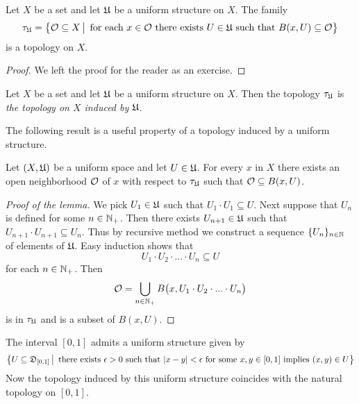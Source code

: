 \begin{fact}\label{fact:topology_induced_by_uniform_structure}
Let $X$ be a set and let ${\mathfrak U}$ be a uniform structure on $X$. The family
$$\tau_{{\mathfrak U}} = \big\{{\mathcal O}\subseteq X\,\big|\,\mbox{ for each }x\in {\mathcal O}\mbox{ there exists }U\in {\mathfrak U}\mbox{ such that }B(x,U)\subseteq {\mathcal O}\big\}$$
is a topology on $X$.
\end{fact}
\begin{proof}
We left the proof for the reader as an exercise.
\end{proof}

\begin{definition}
Let $X$ be a set and let ${\mathfrak U}$ be a uniform structure on $X$. Then the topology $\tau_{{\mathfrak U}}$ is \textit{the topology on $X$ induced by ${\mathfrak U}$}.
\end{definition}
\noindent
The following result is a useful property of a topology induced by a uniform structure. 

\begin{proposition}\label{proposition:each_ball_contains_an_open_subset_with_respect_to_topology_induced_by_uniform_structure}
Let $(X,{\mathfrak U})$ be a uniform space and let $U \in {\mathfrak U}$. For every $x$ in $X$ there exists an open neighborhood ${\mathcal O}$ of $x$ with respect to $\tau_{{\mathfrak U}}$ such that ${\mathcal O}\subseteq B(x,U)$.
\end{proposition}
\begin{proof}[Proof of the lemma]
We pick $U_1 \in {\mathfrak U}$ such that $U_1\cdot U_1 \subseteq U$. Next suppose that $U_n$ is defined for some $n\in {\mathbb N}_+$. Then there exists $U_{n+1}\in {\mathfrak U}$ such that $U_{n+1}\cdot U_{n+1} \subseteq U_n$. Thus by recursive method we construct a sequence $\{U_n\}_{n\in {\mathbb N}}$ of elements of ${\mathfrak U}$. Easy induction shows that
$$U_1\cdot U_2\cdot ...\cdot U_n \subseteq U$$
for each $n\in {\mathbb N}_+$. Then
$${\mathcal O} = \bigcup_{n\in {\mathbb N}_+}B\big(x, U_{1}\cdot U_{2}\cdot ...\cdot U_{n}\big)$$
is in $\tau_{{\mathfrak U}}$ and is a subset of $B(x,U)$.
\end{proof}

\begin{example}\label{example:uniform_structure_on_interval}
The interval $[0,1]$ admits a uniform structure given by
$$\big\{U\subseteq {\mathfrak D}_{[0,1]}\,\big|\,\mbox{ there exists }\epsilon > 0\mbox{ such that }|x - y| < \epsilon\mbox{ for some }x,y\in [0,1]\mbox{ implies }(x,y)\in U\big\}$$
Now the topology induced by this uniform structure coincides with the natural topology on $[0,1]$.
\end{example}

